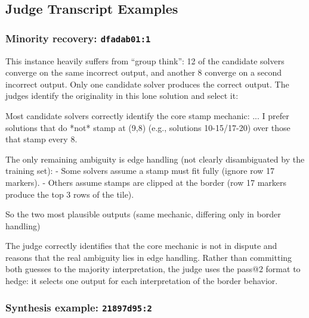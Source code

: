\documentclass[10pt]{article}
\newenvironment{Shaded}{}{}
\newcommand{\NormalTok}[1]{#1}
\begin{document}
\hypertarget{judge-transcript-examples}{%
\subsection{Judge Transcript Examples}\label{judge-transcript-examples}}

\hypertarget{minority-recovery-dfadab011}{%
\subsubsection{\texorpdfstring{Minority recovery:
\texttt{dfadab01:1}}{Minority recovery: dfadab01:1}}\label{minority-recovery-dfadab011}}

This instance heavily suffers from ``group think'': 12 of the candidate
solvers converge on the same incorrect output, and another 8 converge on
a second incorrect output. Only one candidate solver produces the
correct output. The judges identify the originality in this lone
solution and select it:

\begin{Shaded}
\begin{Highlighting}[]
\NormalTok{Most candidate solvers correctly identify the}
\NormalTok{core stamp mechanic:}
\NormalTok{...}
\NormalTok{I prefer solutions that do *not* stamp at (9,8)}
\NormalTok{(e.g., solutions 10{-}15/17{-}20) over those that}
\NormalTok{stamp every 8.}

\NormalTok{The only remaining ambiguity is edge handling}
\NormalTok{(not clearly disambiguated by the training set):}
\NormalTok{{-} Some solvers assume a stamp must fit fully}
\NormalTok{  (ignore row 17 markers).}
\NormalTok{{-} Others assume stamps are clipped at the border}
\NormalTok{  (row 17 markers produce the top 3 rows of}
\NormalTok{  the tile).}

\NormalTok{So the two most plausible outputs}
\NormalTok{(same mechanic, differing only in border handling)}
\end{Highlighting}
\end{Shaded}

The judge correctly identifies that the core mechanic is not in dispute
and reasons that the real ambiguity lies in edge handling. Rather than
committing both guesses to the majority interpretation, the judge uses
the pass@2 format to hedge: it selects one output for each
interpretation of the border behavior.

\hypertarget{synthesis-example-21897d952}{%
\subsubsection{\texorpdfstring{Synthesis example:
\texttt{21897d95:2}}{Synthesis example: 21897d95:2}}\label{synthesis-example-21897d952}}
\end{document}

